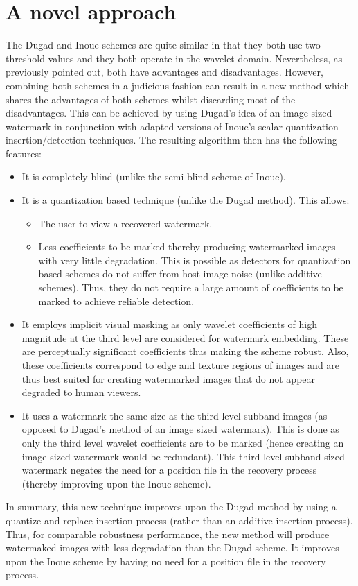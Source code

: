 \documentclass[12pt]{report}
\begin{document}
\section{A novel approach}
The Dugad and Inoue schemes are quite similar in that they both use two threshold values and
they both operate in the wavelet domain. 
Nevertheless, as previously pointed out, both have
advantages and disadvantages. However, combining both schemes in a judicious fashion can result in 
a new method which shares the advantages of both schemes whilst discarding most of the disadvantages.
This can be achieved by using Dugad's idea of an image sized watermark in conjunction with
adapted versions of Inoue's scalar quantization insertion/detection techniques.
The resulting algorithm then has the following features:
\begin{itemize}
 	\item It is completely blind (unlike the semi-blind scheme of Inoue).
	\item It is a quantization based technique (unlike the Dugad method).
	This allows:
	\begin{itemize}
		\item The user to view a recovered watermark.
		\item Less coefficients to be marked thereby producing watermarked images 
		with very little degradation.  
		This is possible as detectors for quantization 
		based schemes do not suffer from host image noise (unlike additive schemes).
		Thus, they do not require a large amount of coefficients to be marked 
		to achieve reliable detection.
	\end{itemize}
	\item It employs implicit visual masking as only wavelet coefficients
	of high magnitude at the third level are considered for watermark embedding.
	These are perceptually significant coefficients thus making the scheme robust.
	Also, these coefficients correspond to edge and texture regions of images and are
	thus best suited for creating watermarked images that do not appear degraded 
	to human viewers.
	\item 
	It uses a watermark the same size as the third level subband images (as opposed
	to Dugad's method of an image sized watermark). This is done as only the third
	level wavelet coefficients are to be marked (hence creating an image sized watermark
	would be redundant). 
	This third level subband sized watermark negates the need for 
	a position file in the recovery process (thereby improving upon the Inoue scheme). 
\end{itemize}
In summary, this new technique improves upon the Dugad method by using a 
quantize and replace insertion process (rather than an additive insertion process).
Thus, for comparable robustness performance, the new method will produce watermaked images
with less degradation than the Dugad scheme.
It improves upon the Inoue scheme
by having no need for a position file in the recovery process.
\end{document}
